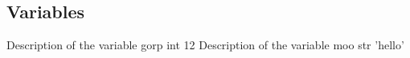 \documentclass{article}
\begin{document}
  \subsection{Variables}

  \begin{EpydocVariableList}
                   {Description of the variable gorp}
                   {int}
                   {12}
                   {Description of the variable moo}
                   {str}
                   {'hello'}
                   {} %
                   {} %
                   {} %
  \end{EpydocVariableList}

\end{document}
